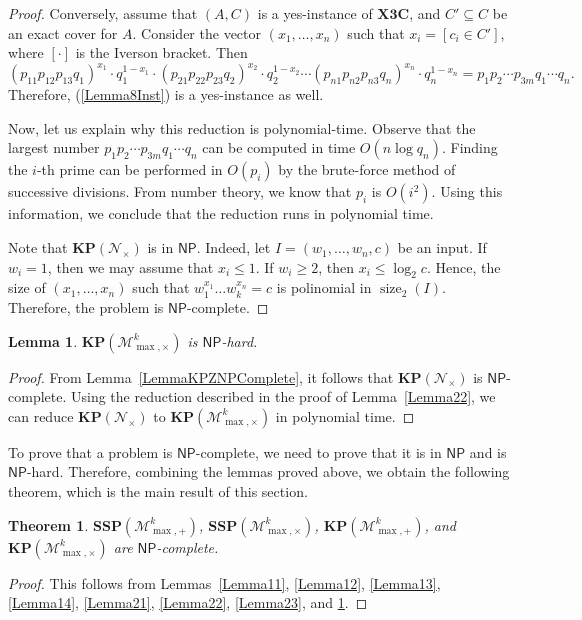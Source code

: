 \documentclass[reqno,12pt]{amsart}
\newtheorem{lemma}{Lemma}
\newtheorem{theorem}{Theorem}
\theoremstyle{definition}
\newcommand{\NP}{\mathsf{NP}}
\newcommand{\MP}{\mathcal{M}_{\max, {+}}^k}
\newcommand{\MT}{\mathcal{M}_{\max, {\times}}^k}
\newcommand{\ZT}{\mathcal{N}_{\times}}
\newcommand{\XThreeC}{\mathbf{X3C}}
\newcommand{\MKP}{\mathbf{KP}(\ZT)}
\newcommand{\SSMPP}{\mathbf{SSP}(\MP)}
\newcommand{\SSMTP}{\mathbf{SSP}(\MT)}
\newcommand{\KMPP}{\mathbf{KP}(\MP)}
\newcommand{\KMTP}{\mathbf{KP}(\MT)}
\DeclareMathOperator{\size}{size}
\begin{document}
\begin{proof}
Conversely, assume that $(A, C)$  is a yes-instance of $\XThreeC$, and
$C' \subseteq C$ be an exact cover for $A$.
Consider the vector $(x_1, \ldots, x_n)$ such that 
$x_i = [c_i \in C']$, where $[\cdot]$ is the Iverson bracket.
Then
$$
(p_{11}p_{12}p_{13}q_1)^{x_1} \cdot q_1^{1 - x_1} \cdot (p_{21}p_{22}p_{23}q_2)^{x_2} \cdot q_2^{1 - x_2} \cdots (p_{n1}p_{n2}p_{n3}q_n)^{x_n} \cdot q_n^{1 - x_n} = p_1p_2\cdots p_{3m}q_1\cdots q_n.
$$
Therefore, (\ref{Lemma8Inst}) is a yes-instance as well.

Now, let us explain why this reduction is polynomial-time.
Observe that the largest number $p_1p_2\cdots p_{3m}q_1\cdots q_n$ can be computed in time $O(n \log q_n)$. Finding the $i$-th prime can be performed in $O(p_i)$ by the brute-force method of successive divisions.
From number theory, we know that $p_i$ is $O(i^2)$. Using this information, we conclude that the reduction runs in polynomial time.

Note that $\MKP$ is in $\NP$. Indeed, let $I = (w_1, \ldots, w_n, c)$ be an input. If $w_i = 1$, then we may assume that $x_i \leq 1$. 
If $w_i \geq 2$, then $x_i \leq \log_2{c}$. Hence, the size of $(x_1, \ldots, x_n)$ such that $w_1^{x_1} \ldots w_k^{x_n} = c$ is polinomial in $\size_2(I)$. Therefore, the problem is $\NP$-complete.
\end{proof}

\begin{lemma}\label{Lemma24}
$\KMTP$ is $\NP$-hard.
\end{lemma}

\begin{proof}
From Lemma~\ref{LemmaKPZNPComplete}, it follows that $\mathbf{KP}(\mathcal{N}_{\times})$ is $\NP$-complete.
Using the reduction described in the proof of Lemma~\ref{Lemma22}, we can reduce $\mathbf{KP}(\mathcal{N}_{\times})$ to $\KMTP$ in polynomial time.
\end{proof}

To prove that a problem is $\NP$-complete, we need to prove that it is in $\NP$ and is $\NP$-hard.
Therefore, combining the lemmas proved above, we obtain the following theorem, which is the main result of this section.

\begin{theorem}\label{Th11}
$\SSMPP$, $\SSMTP$, $\KMPP$, and $\KMTP$ are $\NP$-com\-plete.
\end{theorem}

\begin{proof}
This follows from Lemmas~\ref{Lemma11}, \ref{Lemma12}, \ref{Lemma13}, \ref{Lemma14}, \ref{Lemma21}, \ref{Lemma22}, \ref{Lemma23}, and \ref{Lemma24}. 
\end{proof}
\end{document}
